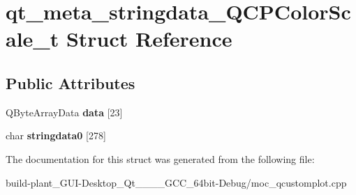 \hypertarget{structqt__meta__stringdata__QCPColorScale__t}{}\section{qt\+\_\+meta\+\_\+stringdata\+\_\+\+Q\+C\+P\+Color\+Scale\+\_\+t Struct Reference}
\label{structqt__meta__stringdata__QCPColorScale__t}
\subsection*{Public Attributes}
\begin{DoxyCompactItemize}
\item 
\mbox{\label{structqt__meta__stringdata__QCPColorScale__t_adbfbd7275c982d9d6c70985a35909562}} 
Q\+Byte\+Array\+Data {\bfseries data} \mbox{[}23\mbox{]}
\item 
\mbox{\label{structqt__meta__stringdata__QCPColorScale__t_a0ed4cd437d62f56ea375637ec624a59c}} 
char {\bfseries stringdata0} \mbox{[}278\mbox{]}
\end{DoxyCompactItemize}


The documentation for this struct was generated from the following file\+:\begin{DoxyCompactItemize}
\item 
build-\/plant\+\_\+\+G\+U\+I-\/\+Desktop\+\_\+\+Qt\+\_\+\_\+\_\+\_\+\+G\+C\+C\+\_\+64bit-\/\+Debug/moc\+\_\+qcustomplot.\+cpp\end{DoxyCompactItemize}
